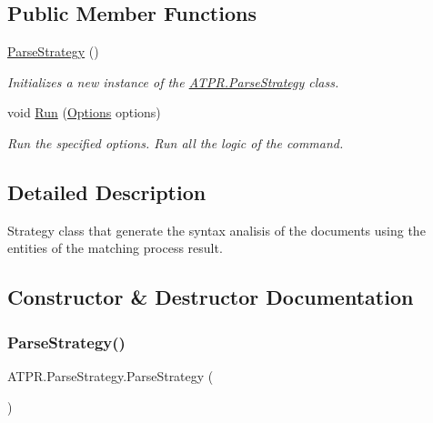 \subsection*{Public Member Functions}
\begin{DoxyCompactItemize}
\item 
\hyperlink{class_a_t_p_r_1_1_parse_strategy_a9f3b68bd95185518be25cc33d50c8c67}{Parse\+Strategy} ()
\begin{DoxyCompactList}\small\item\em Initializes a new instance of the \hyperlink{class_a_t_p_r_1_1_parse_strategy}{A\+T\+P\+R.\+Parse\+Strategy} class. \end{DoxyCompactList}\item 
void \hyperlink{class_a_t_p_r_1_1_parse_strategy_ae5b4ddf4a1578070dfaa1c332a118438}{Run} (\hyperlink{class_a_t_p_r_1_1_options}{Options} options)
\begin{DoxyCompactList}\small\item\em Run the specified options. Run all the logic of the command. \end{DoxyCompactList}\end{DoxyCompactItemize}


\subsection{Detailed Description}
Strategy class that generate the syntax analisis of the documents using the entities of the matching process result. 



\subsection{Constructor \& Destructor Documentation}
\hypertarget{class_a_t_p_r_1_1_parse_strategy_a9f3b68bd95185518be25cc33d50c8c67}{}\label{class_a_t_p_r_1_1_parse_strategy_a9f3b68bd95185518be25cc33d50c8c67} 
\subsubsection{\texorpdfstring{Parse\+Strategy()}{ParseStrategy()}}
{\footnotesize\ttfamily A\+T\+P\+R.\+Parse\+Strategy.\+Parse\+Strategy (\begin{DoxyParamCaption}{ }\end{DoxyParamCaption})\hspace{0.3cm}{\ttfamily [inline]}}



